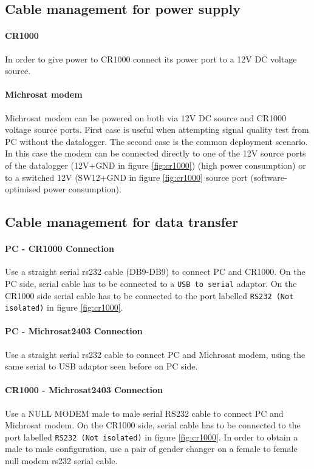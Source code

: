 \subsection{Cable management for power supply}
\paragraph{CR1000}
In order to give power to CR1000 connect its power port to a 12V DC voltage source.
\paragraph{Michrosat modem}
Michrosat modem can be powered on both via 12V DC source and CR1000 voltage source ports. First case is useful when attempting signal quality test from PC without the datalogger.
The second case is the common deployment scenario. In this case the modem can be connected directly to one of the 12V source ports of the datalogger (12V+GND in figure \ref{fig:cr1000}) (high power consumption) or to a switched 12V (SW12+GND in figure \ref{fig:cr1000} source port (software-optimised power consumption).
\subsection{Cable management for data transfer}
\label{subsec:datacable}
\paragraph{PC - CR1000 Connection}
Use a straight serial rs232 cable (DB9-DB9) to connect PC and CR1000. On the PC side, serial cable has to be connected to a {\tt USB to serial} adaptor. On the CR1000 side serial cable has to be connected to the port labelled {\tt RS232 (Not isolated)} in figure \ref{fig:cr1000}.
\paragraph{PC - Michrosat2403 Connection}
Use a straight serial rs232 cable to connect PC and Michrosat modem, using the same serial to USB adaptor seen before on PC side.
\paragraph{CR1000 - Michrosat2403 Connection}
Use a NULL MODEM male to male serial RS232 cable to connect PC and Michrosat modem. On the CR1000 side, serial cable has to be connected to the port labelled {\tt RS232 (Not isolated)} in figure \ref{fig:cr1000}. In order to obtain a male to male configuration, use a pair of gender changer on a female to female null modem rs232 serial cable.